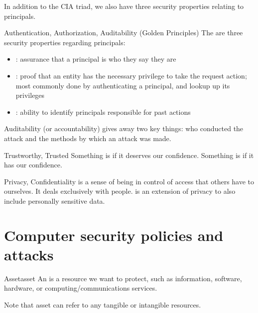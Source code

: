 \documentclass[code]{amznotes}
\begin{document}
In addition to the CIA triad, we also have three security properties relating to principals.
\begin{dfnbox}{Authentication, Authorization, Auditability (Golden Principles)}{}
    The  are three security properties regarding principals:

    \begin{itemize}[noitemsep]
        \item {}: assurance that a principal is who they say they are
        \item {}: proof that an entity has the necessary privilege to take the request action; most commonly done by authenticating a principal, and lookup up its privileges
        \item {}: ability to identify principals responsible for past actions
    \end{itemize}

\end{dfnbox}

Auditability (or accountability) gives away two key things: who conducted the attack and the methods by which an attack was made.

\begin{dfnbox}{Trustworthy, Trusted}{}
    Something is  if it deserves our confidence.     Something is  if it has our confidence.

\end{dfnbox}

\begin{dfnbox}{Privacy, Confidentiality}{}
     is a sense of being in control of access that others have to ourselves. It deals exclusively with people.  is an extension of privacy to also include personally sensitive data.
\end{dfnbox}

\section{Computer security policies and attacks}

\begin{dfnbox}{Asset}{asset}
    An  is a resource we want to protect, such as information, software, hardware, or computing/communications services.
\end{dfnbox}

Note that asset can refer to any tangible or intangible resources.
\end{document}
